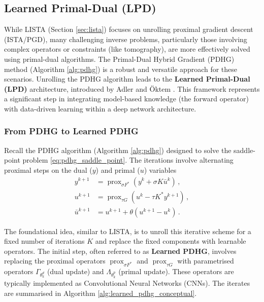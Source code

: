 \subsection{Learned Primal-Dual (LPD)}

While LISTA (Section \ref{sec:lista}) focuses on unrolling proximal gradient descent (ISTA/PGD), many challenging inverse problems, particularly those involving complex operators or constraints (like tomography), are more effectively solved using primal-dual algorithms. The Primal-Dual Hybrid Gradient (PDHG) method (Algorithm \ref{alg:pdhg}) is a robust and versatile approach for these scenarios. Unrolling the PDHG algorithm leads to the \textbf{Learned Primal-Dual (LPD)} architecture, introduced by Adler and {\"O}ktem \cite{adler2018learned}. This framework represents a significant step in integrating model-based knowledge (the forward operator) with data-driven learning within a deep network architecture.

\subsubsection{From PDHG to Learned PDHG}
Recall the PDHG algorithm (Algorithm \ref{alg:pdhg}) designed to solve the saddle-point problem \eqref{eq:pdhg_saddle_point}. The iterations involve alternating proximal steps on the dual ($y$) and primal ($u$) variables
\begin{subequations}\label{eq:pdhg_recap}
\begin{align}
y^{k+1} &= \operatorname{prox}_{\sigma F^*}(y^k + \sigma K \bar{u}^k) \, , \\
u^{k+1} &= \operatorname{prox}_{\tau G}(u^k - \tau K^* y^{k+1}) \, , \\
\bar{u}^{k+1} &= u^{k+1} + \theta (u^{k+1} - u^k) \, .
\end{align}
\end{subequations}

The foundational idea, similar to LISTA, is to unroll this iterative scheme for a fixed number of iterations $K$ and replace the fixed components with learnable operators. The initial step, often referred to as \textbf{Learned PDHG}, involves replacing the proximal operators $\operatorname{prox}_{\sigma F^*}$ and $\operatorname{prox}_{\tau G}$ with parametrised operators $\Gamma_{\theta_k^d}$ (dual update) and $\Lambda_{\theta_k^p}$ (primal update). These operators are typically implemented as Convolutional Neural Networks (CNNs). The iterates are summarised in Algorithm \ref{alg:learned_pdhg_conceptual}.

